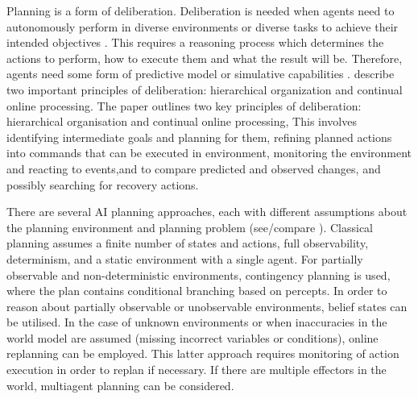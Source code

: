 \documentclass{article}
\begin{document}
Planning is a form of deliberation. Deliberation is needed when agents need to autonomously perform in diverse environments or diverse tasks to achieve their intended objectives \cite{ghallab_automated_2016}. 
This requires a reasoning process which determines the actions to perform, how to execute them and what the result will be. Therefore, agents need some form of predictive model or simulative capabilities \cite{ghallab_automated_2016}. 
\cite{ghallab_automated_2016} describe two important principles of deliberation: hierarchical organization and continual online processing. 
The paper \cite{ghallab_automated_2016} outlines two key principles of deliberation: hierarchical organisation and continual online processing, This involves identifying intermediate goals and planning for them, refining planned actions into commands that can be executed in environment, monitoring the environment and reacting to events,and to compare predicted and observed changes, and possibly searching for recovery actions.

There are several AI planning approaches, each with different assumptions about the planning environment and planning problem (see/compare \cite{russell_artificial_2010}). Classical planning assumes a finite number of states and actions, full observability, determinism, and a static environment with a single agent. For partially observable and non-deterministic environments, contingency planning is used, where the plan contains conditional branching based on percepts. In order to reason about partially observable or unobservable environments, belief states can be utilised. In the case of unknown environments or when inaccuracies in the world model are assumed (missing incorrect variables or conditions), online replanning can be employed. This latter approach requires monitoring of action execution in order to replan if necessary. If there are multiple effectors in the world, multiagent planning can be considered.
\end{document}
